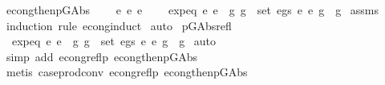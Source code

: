 \begin{isabellebody}
%
\endisadelimproof
\isanewline
\isanewline
{}\isamarkupfalse%
\ econg{\isacharunderscore}{\kern0pt}then{\isacharunderscore}{\kern0pt}p{\isacharunderscore}{\kern0pt}GAbs{\isacharcolon}{\kern0pt}\isanewline
\ \ \ \ {\isachardoublequoteopen}e{}\ {\isasymsimeq}e\ e{}{\isachardoublequoteclose}\isanewline
\ \ \ \ {\isachardoublequoteopen}expeq\ e{}\ e{}\ {\isacharampersand}{\kern0pt}\ {\isacharparenleft}{\kern0pt}{\isasymforall}{\isacharparenleft}{\kern0pt}g{}{\isacharcomma}{\kern0pt}\ g{}{\isacharparenright}{\kern0pt}\ {\isasymin}\ set\ {\isacharparenleft}{\kern0pt}egs\ e{}\ e{}{\isacharparenright}{\kern0pt}{\isachardot}{\kern0pt}\ g{}\ {\isasymsimeq}\ g{}{\isacharparenright}{\kern0pt}{\isachardoublequoteclose}\isanewline
%
\isadelimproof
%
\endisadelimproof
%
\isatagproof
{}\isamarkupfalse%
\ assms\isanewline
{}\isamarkupfalse%
\ {\isacharparenleft}{\kern0pt}induction\ rule{\isacharcolon}{\kern0pt}\ econg{\isachardot}{\kern0pt}induct{\isacharparenright}{\kern0pt}\isanewline
{}\isamarkupfalse%
\ auto%
\endisatagproof
{\isafoldproof}%
%
\isadelimproof
\isanewline
%
\endisadelimproof
\isanewline
\isanewline
{}\isamarkupfalse%
\ p{\isacharunderscore}{\kern0pt}GAbs{\isacharunderscore}{\kern0pt}refl{\isacharcolon}{\kern0pt}\isanewline
\ \ {\isachardoublequoteopen}expeq\ e\ e\ {\isacharampersand}{\kern0pt}\ {\isacharparenleft}{\kern0pt}{\isasymforall}{\isacharparenleft}{\kern0pt}g{}{\isacharcomma}{\kern0pt}\ g{}{\isacharparenright}{\kern0pt}\ {\isasymin}\ set\ {\isacharparenleft}{\kern0pt}egs\ e\ e{\isacharparenright}{\kern0pt}{\isachardot}{\kern0pt}\ g{}\ {\isasymsimeq}\ g{}{\isacharparenright}{\kern0pt}{\isachardoublequoteclose}\isanewline
%
\isadelimproof
%
\endisadelimproof
%
\isatagproof
{}\isamarkupfalse%
\ auto\isanewline
{}\isamarkupfalse%
\ {\isacharparenleft}{\kern0pt}simp\ add{\isacharcolon}{\kern0pt}\ econg{\isacharunderscore}{\kern0pt}reflp\ econg{\isacharunderscore}{\kern0pt}then{\isacharunderscore}{\kern0pt}p{\isacharunderscore}{\kern0pt}GAbs{\isacharparenright}{\kern0pt}\isanewline
{}\isamarkupfalse%
\ {\isacharparenleft}{\kern0pt}metis\ case{\isacharunderscore}{\kern0pt}prod{\isacharunderscore}{\kern0pt}conv\ econg{\isacharunderscore}{\kern0pt}reflp\ econg{\isacharunderscore}{\kern0pt}then{\isacharunderscore}{\kern0pt}p{\isacharunderscore}{\kern0pt}GAbs{\isacharparenright}{\kern0pt}%

\end{isabellebody}
